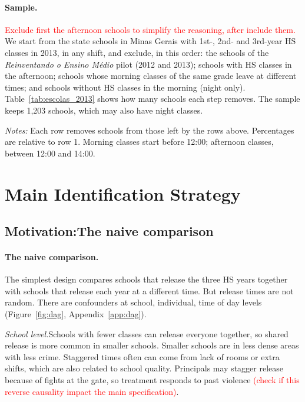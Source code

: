 \documentclass[11pt]{article}
\begin{document}
\paragraph{Sample.} \textcolor{red}{Exclude first the afternoon schools to
simplify the reasoning, after include them.} We start from the state schools in
Minas Gerais with 1st-, 2nd- and 3rd-year HS classes in 2013, in any shift, and
exclude, in this order: the schools of the \emph{Reinventando o Ensino M\'edio}
pilot (2012 and 2013); schools with HS classes in the afternoon; schools whose
morning classes of the same grade leave at different times; and schools without
HS classes in the morning (night only). Table~\ref{tab:escolas_2013} shows how
many schools each step removes. The sample keeps 1,203 schools, which may also
have night classes.

\begin{table}[H]
\centering
\caption{Sample selection, 2013.}
\label{tab:escolas_2013}

\par\medskip
\begin{minipage}{0.9\textwidth}
\footnotesize \emph{Notes:} Each row removes schools from those left by the rows
above. Percentages are relative to row 1. Morning classes start before 12:00;
afternoon classes, between 12:00 and 14:00.
\end{minipage}
\end{table}


\section{Main Identification Strategy}

\subsection{Motivation:The naive comparison}

\paragraph{The naive comparison.} The simplest design compares schools that
release the three HS years together with schools that release each year at a
different time. But release times are not random. There are confounders at school, individual, time of day levels (Figure~\ref{fig:dag}, Appendix~\ref{app:dag}).

\emph{School level.}Schools with fewer classes can release
        everyone together, so shared release is more common in smaller schools.
        Smaller schools are in less dense areas with less crime. Staggered times often can come from lack of rooms
        or extra shifts, which are also related to school quality.
 Principals may stagger release
        because of fights at the gate, so treatment responds to past
        violence \textcolor{red}{(check if this reverse causality impact the main specification)}.
\end{document}
